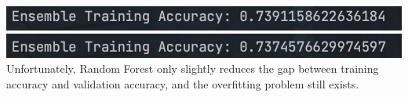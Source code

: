 \documentclass{article}
\begin{document}
\begin{enumerate}
    \includegraphics[width=0.7\linewidth]{6111723195885_.pic.jpg} \vspace{10}\\
    \includegraphics[width=0.7\linewidth]{6131723196143_.pic.jpg} \vspace{15}\\
    Unfortunately, Random Forest only slightly reduces the gap between training accuracy and validation accuracy, and the overfitting problem still exists.\\


\end{enumerate}
\end{document}
